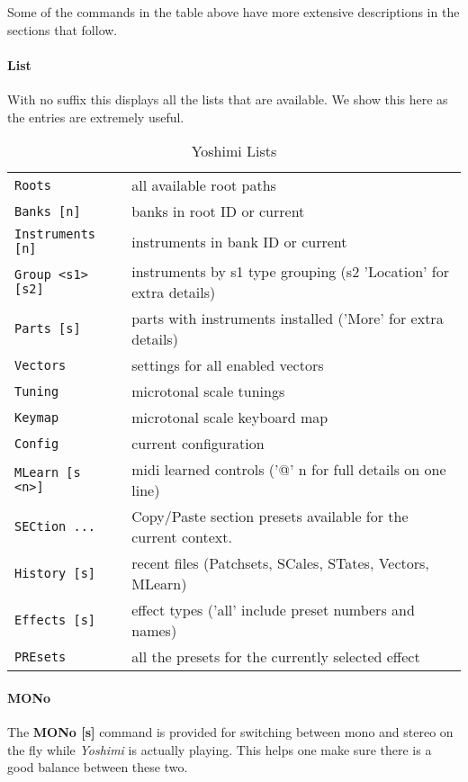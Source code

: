    Some of the commands in the table above have more extensive descriptions
   in the sections that follow.

\paragraph{List}
\label{paragraph:command_line_list}
   With no suffix this displays all the lists that are available. We show
   this here as the entries are extremely useful.
\begin{center}
\begin{longtable}{p{6cm} p{10cm}}
\caption[Yoshimi Lists]{Yoshimi Lists} \\
\texttt{Roots} &
   all available root paths \\
\texttt{Banks [n]} &
   banks in root ID or current \\
\texttt{Instruments [n]} &
   instruments in bank ID or current \\
\texttt{Group <s1> [s2]} &
   instruments by s1 type grouping (s2 'Location' for extra details) \\
\texttt{Parts [s]} &
   parts with instruments installed ('More' for extra details) \\
\texttt{Vectors} &
   settings for all enabled vectors \\
\texttt{Tuning} &
   microtonal scale tunings \\
\texttt{Keymap} &
   microtonal scale keyboard map \\
\texttt{Config} &
   current configuration \\
\texttt{MLearn [s <n>]} &
   midi learned controls ('@' n for full details on one line) \\
\texttt{SECtion ...} &
   Copy/Paste section presets available for the current context. \\
\texttt{History [s]} &
   recent files (Patchsets, SCales, STates, Vectors, MLearn) \\
\texttt{Effects [s]} &
   effect types ('all' include preset numbers and names) \\
\texttt{PREsets } &
  all the presets for the currently selected effect \\
\end{longtable}
\end{center}
\paragraph{MONo}
\label{paragraph:command_line_mono}
    The \textbf{MONo [s]} command is provided for switching between mono and
    stereo on the fly while \textsl{Yoshimi} is actually playing. This helps
    one make sure there is a good balance between these two.

